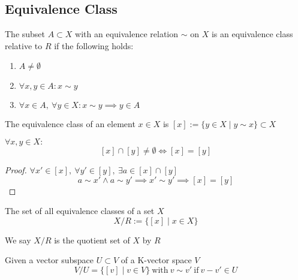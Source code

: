 \subsection{Equivalence Class}
\begin{definition}
   The subset \(A \subset X\) with an equivalence relation \(\sim\) on \(X\) is an equivalence class relative to \(R\) if the following holds:

   \begin{enumerate}[label=(\roman*)]
      \item \(A \neq \emptyset\)
      \item \(\forall x, y \in A: x \sim y\)
      \item \(\forall x \in A,~\forall y \in X: x \sim y \implies y \in A\)
   \end{enumerate}

   The equivalence class of an element \(x \in X\) is \([x] := \{y \in X \mid y \sim x\} \subset X\)
\end{definition}

\begin{proposition}
   \(\forall x, y \in X:\)
   \[[x] \cap [y] \neq \emptyset \iff [x] = [y]\]
\end{proposition}
\begin{proof}
   \(\forall x' \in [x],~\forall y' \in [y],~\exists a \in [x] \cap [y]\)
   \[a \sim x' \land a \sim y' \implies x' \sim y' \implies [x] = [y]\]
\end{proof}

\begin{definition}
   The set of all equivalence classes of a set \(X\) 
   \[X/R := \{[x] \mid x \in X\}\]
\end{definition}
\begin{remark}
   We say \(X/R\) is the quotient set of \(X\) by \(R\)
\end{remark}

\begin{definition}[Quotientspace]
   Given a vector subspace \(U \subset V\) of a K-vector space \(V\)
   \[V/U = \{[v] \mid v \in V\}~\text{with}~v \sim v'~\text{if}~v - v' \in U\]
\end{definition}

